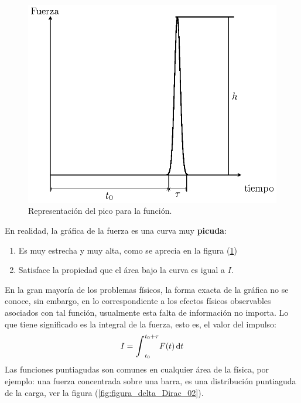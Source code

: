 \documentclass[12pt]{article}
\def\scaleint#1{\vcenter{\hbox{\scaleto[3ex]{\displaystyle\int}{#1}}}}
\numberwithin{equation}{section}
\begin{document}
\begin{figure}[H]
    \centering
    \includegraphics[scale=0.8]{Imagenes/delta_Dirac_01.eps}
    \caption{Representación del pico para la función.}
    \label{fig:figura_delta_Dirac_01}
\end{figure}
En realidad, la gráfica de la fuerza es una curva muy \textbf{picuda}:
\begin{enumerate}
\item Es muy estrecha y muy alta, como se aprecia en la figura (\ref{fig:figura_delta_Dirac_01})
\item Satisface la propiedad que el área bajo la curva es igual a $I$.
\end{enumerate}
En la gran mayoría de los problemas físicos, la forma exacta de la gráfica no se conoce,  sin embargo, en lo correspondiente a los efectos físicos observables asociados con tal función, usualmente esta falta de información no importa. Lo que tiene significado es la integral de la fuerza, esto es, el valor del impulso:
\begin{align*}
I = \scaleint{6ex}_{t_{0}}^{t_{0} + \tau } F (t) \dd{t}
\end{align*}
Las funciones puntiagudas son comunes en cualquier área de la física,  por ejemplo: una fuerza concentrada sobre una barra, es una distribución puntiaguda de la carga, ver la figura (\ref{fig:figura_delta_Dirac_02}). 
\end{document}
